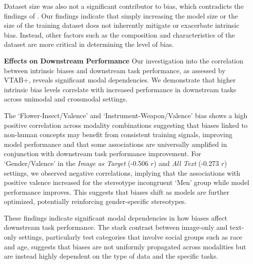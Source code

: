 Dataset size was also not a significant contributor to bias, which contradicts the findings of \citet{Berg2022ALearning}. Our findings indicate that simply increasing the model size or the size of the training dataset does not inherently mitigate or exacerbate intrinsic bias. Instead, other factors such as the composition and characteristics of the dataset are more critical in determining the level of bias.


\noindent \textbf{Effects on Downstream Performance} Our investigation into the correlation between intrinsic biases and downstream task performance, as assessed by VTAB+, reveals significant modal dependencies. We demonstrate that higher intrinsic bias levels correlate with increased performance in downstream tasks across unimodal and crossmodal settings. 

The `Flower-Insect/Valence' and `Instrument-Weapon/Valence' bias shows a high positive correlation across modality combinations suggesting that biases linked to non-human concepts may benefit from consistent training signals, improving model performance and that some associations are universally amplified in conjunction with downstream task performance improvement. For `Gender/Valence' in the \textit{Image as Target} (-0.506 $r$) and  \textit{All Text} (-0.273 $r$) settings, we observed negative correlations, implying that the associations with positive valence increased for the stereotype incongruent `Men' group while model performance improves. This suggests that biases shift as models are further optimized, potentially reinforcing gender-specific stereotypes.

These findings indicate significant modal dependencies in how biases affect downstream task performance. The stark contrast between image-only and text-only settings, particularly test categories that involve social groups such as race and age, suggests that biases are not uniformly propagated across modalities but are instead highly dependent on the type of data and the specific tasks. 
